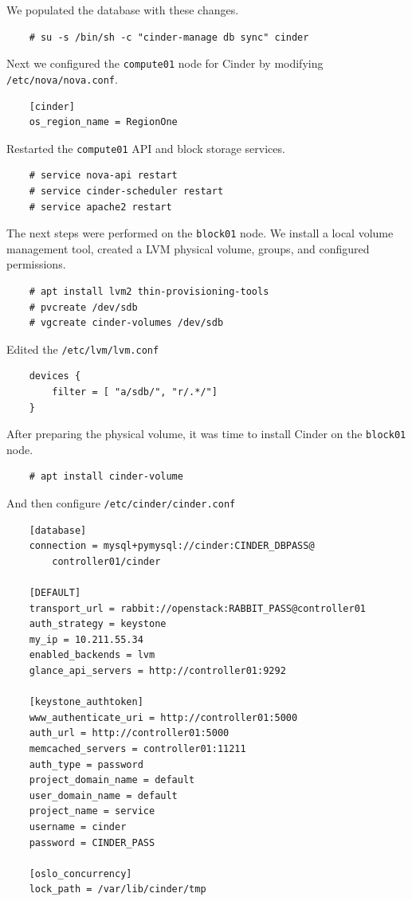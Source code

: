 \documentclass{article}
\begin{document}
We populated the database with these changes.

\begin{verbatim}
    # su -s /bin/sh -c "cinder-manage db sync" cinder
\end{verbatim}

Next we configured the \texttt{compute01} node for Cinder by modifying \texttt{/etc/nova/nova.conf}.

\begin{verbatim}
    [cinder]
    os_region_name = RegionOne
\end{verbatim}

Restarted the \texttt{compute01} API and block storage services.

\begin{verbatim}
    # service nova-api restart
    # service cinder-scheduler restart
    # service apache2 restart
\end{verbatim}

The next steps were performed on the \texttt{block01} node. We install a local volume management tool, created a LVM physical volume, groups, and configured permissions.

\begin{verbatim}
    # apt install lvm2 thin-provisioning-tools
    # pvcreate /dev/sdb
    # vgcreate cinder-volumes /dev/sdb
\end{verbatim}

Edited the \texttt{/etc/lvm/lvm.conf}

\begin{verbatim}
    devices {
        filter = [ "a/sdb/", "r/.*/"]
    }
\end{verbatim}

After preparing the physical volume, it was time to install Cinder on the \texttt{block01} node.

\begin{verbatim}
    # apt install cinder-volume
\end{verbatim}

And then configure \texttt{/etc/cinder/cinder.conf}

\begin{verbatim}
    [database]
    connection = mysql+pymysql://cinder:CINDER_DBPASS@
        controller01/cinder

    [DEFAULT]
    transport_url = rabbit://openstack:RABBIT_PASS@controller01
    auth_strategy = keystone
    my_ip = 10.211.55.34
    enabled_backends = lvm
    glance_api_servers = http://controller01:9292

    [keystone_authtoken]
    www_authenticate_uri = http://controller01:5000
    auth_url = http://controller01:5000
    memcached_servers = controller01:11211
    auth_type = password
    project_domain_name = default
    user_domain_name = default
    project_name = service
    username = cinder
    password = CINDER_PASS

    [oslo_concurrency]
    lock_path = /var/lib/cinder/tmp
\end{verbatim}
\end{document}
